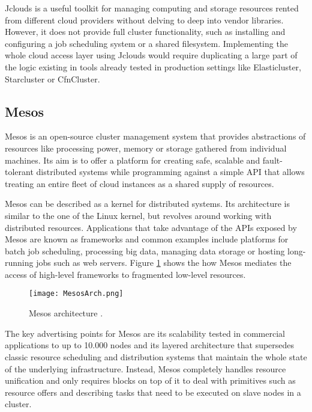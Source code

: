 Jclouds is a useful toolkit for managing computing and storage resources rented from different cloud providers without delving to deep into vendor libraries. However, it does not provide full cluster functionality, such as installing and configuring a job scheduling system or a shared filesystem. Implementing the whole cloud access layer using Jclouds would require duplicating a large part of the logic existing in tools already tested in production settings like Elasticluster, Starcluster or CfnCluster.

\subsection{Mesos}

Mesos \cite{Mesos} is an open-source cluster management system that provides abstractions of resources like processing power, memory or storage gathered from individual machines. Its aim is to offer a platform for creating safe, scalable and fault-tolerant distributed systems while programming against a simple API that allows treating an entire fleet of cloud instances as a shared supply of resources.

Mesos can be described as a kernel for distributed systems. Its architecture is similar to the one of the Linux kernel, but revolves around working with distributed resources. Applications that take advantage of the APIs exposed by Mesos are known as frameworks and common examples include platforms for batch job scheduling, processing big data, managing data storage or hosting long-running jobs such as web servers. Figure \ref{MesosArch} shows the how Mesos mediates the access of high-level frameworks to fragmented low-level resources.

\begin{figure}[h]
	\centering
		\texttt{[image: MesosArch.png]}
	\caption{Mesos architecture \cite{MesosArch}.}
	\label{MesosArch}
\end{figure}

The key advertising points for Mesos are its scalability tested in commercial applications to up to 10.000 nodes and its layered architecture that supersedes classic resource scheduling and distribution systems that maintain the whole state of the underlying infrastructure. Instead, Mesos completely handles resource unification and only requires blocks on top of it to deal with primitives such as resource offers and describing tasks that need to be executed on slave nodes in a cluster.

